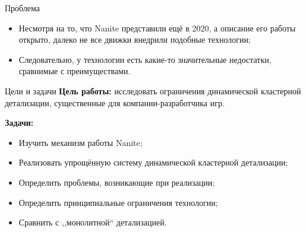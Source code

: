 \documentclass{beamer}
\begin{document}
    \begin{frame}{Проблема}
        \begin{itemize}
            \item Несмотря на то,
            что Nanite представили ещё в 2020,
            а описание его работы открыто,
            далеко не все движки внедрили подобные технологии;

            \item Следовательно, у технологии есть
            какие-то значительные недостатки,
            сравнимые с преимуществами.
        \end{itemize}
    \end{frame}

    \begin{frame}{Цели и задачи}
        \textbf{Цель работы:}
        исследовать ограничения динамической кластерной детализации,
        существенные для компании-разработчика игр.

        \bigskip

        \textbf{Задачи:}
        \begin{itemize}
            \item Изучить механизм работы Nanite;
            \item Реализовать упрощённую систему
            динамической кластерной детализации;
            \item Определить проблемы, возникающие при реализации;
            \item Определить принципиальные ограничения технологии;
            \item Сравнить с ,,монолитной`` детализацией.
        \end{itemize}
    \end{frame}
\end{document}
